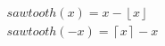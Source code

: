 \documentclass[12pt,fleqn]{standalone}
\begin{document}
\begin{preview}
\Large
$
\begin{aligned}
{\displaystyle sawtooth(x)= x - \left\lfloor x \right\rfloor}\\
{\displaystyle sawtooth(-x)= \left\lceil x \right\rceil - x}
\end{aligned}
$
\end{preview}
\end{document}
